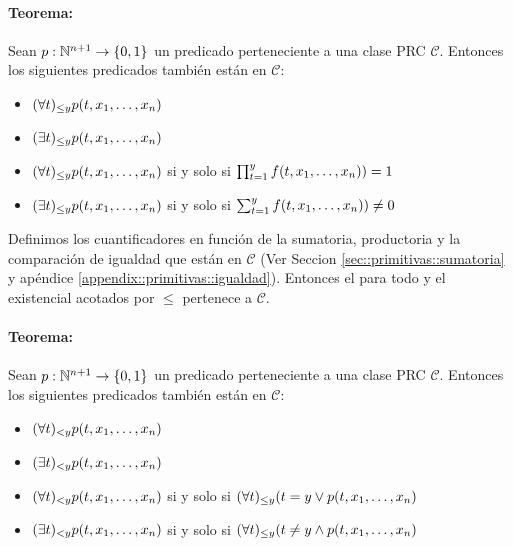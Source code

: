 \paragraph{Teorema:} Sean $p:\mathbb{N}^{n+1}\to\{0,1\}$ un predicado perteneciente a una clase PRC $\mathcal{C}$. Entonces los siguientes predicados también están en $\mathcal{C}$:
\begin{itemize}
	\item[] $(\forall t)_{\leq y} p(t,x_1,\dots, x_{n})$ 
	\item[] $(\exists t)_{\leq y} p(t,x_1,\dots, x_{n})$
\end{itemize}

\begin{demo}
\begin{itemize}
	\item[] $(\forall t)_{\leq y} p(t,x_1,\dots, x_{n})$ si y solo si $\prod_{t=1}^{y} f(t,x_1,\dots, x_{n})) = 1$
	\item[] $(\exists t)_{\leq y} p(t,x_1,\dots, x_{n})$ si y solo si $\sum_{t=1}^{y} f(t,x_1,\dots, x_{n})) \neq 0$
\end{itemize}
Definimos los cuantificadores en función de la sumatoria, productoria y la comparación de igualdad que están en $\mathcal{C}$ (Ver Seccion \ref{sec::primitivas::sumatoria} y apéndice \ref{appendix::primitivas::igualdad}). Entonces el para todo y el existencial acotados por $\leq$ pertenece a $\mathcal{C}$.
\end{demo}

\paragraph{Teorema:} Sean $p:\mathbb{N}^{n+1}\to\{0,1\}$ un predicado perteneciente a una clase PRC $\mathcal{C}$. Entonces los siguientes predicados también están en $\mathcal{C}$:
\begin{itemize}
	\item[] $(\forall t)_{< y} p(t,x_1,\dots, x_{n})$ 
	\item[] $(\exists t)_{< y} p(t,x_1,\dots, x_{n})$
\end{itemize}

\begin{demo}
\begin{itemize}
	\item[] $(\forall t)_{< y} p(t,x_1,\dots, x_{n})$ si y solo si $(\forall t)_{\leq y} (t=y \lor p(t,x_1,\dots, x_{n})$
	\item[] $(\exists t)_{< y} p(t,x_1,\dots, x_{n})$ si y solo si $(\forall t)_{\leq y} (t\neq y \land p(t,x_1,\dots, x_{n})$
\end{itemize}
\end{demo}

